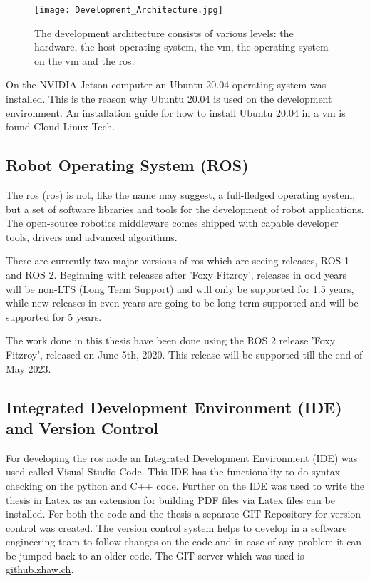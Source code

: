 \begin{figure}[H]
    \centering
    \texttt{[image: Development\_Architecture.jpg]}
    \caption{The development architecture consists of various levels: the hardware, the host operating system, the \acrlong{vm}, the operating system on the \acrshort{vm} and the \acrlong{ros}.}
    \label{fig:Development Architecture}
\end{figure}

On the NVIDIA Jetson computer an Ubuntu 20.04 operating system was installed. This is the reason why Ubuntu 20.04 is used on the development environment. An installation guide for how to install Ubuntu 20.04 in a \acrlong{vm} is found Cloud Linux Tech. \cite{cloudlinuxtech_install_ubuntu_2004}

\subsection{Robot Operating System (ROS)} \label{sec:Robot Operating System (ROS)}
The \acrlong{ros} (\acrshort{ros}) is not, like the name may suggest, a full-fledged operating system, but a set of software libraries and tools for the development of robot applications. The open-source robotics middleware comes shipped with capable developer tools, drivers and advanced algorithms. \cite{ros2_documentation}

There are currently two major versions of \acrshort{ros} which are seeing releases, ROS 1 and ROS 2. \cite{ros2_documentation} Beginning with releases after 'Foxy Fitzroy', releases in odd years will be non-LTS (Long Term Support) and will only be supported for 1.5 years, while new releases in even years are going to be long-term supported and will be supported for 5 years. \cite{ros2_documentation}

The work done in this thesis have been done using the ROS 2 release 'Foxy Fitzroy', released on June 5th, 2020. This release will be supported till the end of May 2023. \cite{ros2_releases_and_target_platforms}

\subsection{Integrated Development Environment (IDE) and Version Control} \label{sec:Integrated Development Environment (IDE) and Version Control}
For developing the \acrshort{ros} node an Integrated Development Environment (IDE) was used called Visual Studio Code. This IDE has the functionality to do syntax checking on the python and C++ code. Further on the IDE was used to write the thesis in Latex as an extension for building PDF files via Latex files can be installed. For both the code and the thesis a separate GIT Repository for version control was created. The version control system helps to develop in a software engineering team to follow changes on the code and in case of any problem it can be jumped back to an older code. The GIT server which was used is \href{https://github.zhaw.ch}{github.zhaw.ch}.

